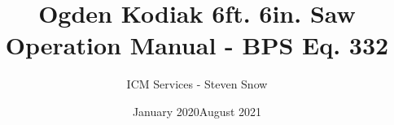 \documentclass[a4paper,12pt]{book}
\begin{document}
\author{ICM Services - Steven Snow}
\title{Ogden Kodiak 6ft. 6in. Saw Operation Manual - BPS Eq. 332}
\date{January 2020}
\date{August 2021}

\frontmatter
\maketitle
\tableofcontents
\listoffigures


\mainmatter










\backmatter
{}
\printindex

\appendix

\end{document}
